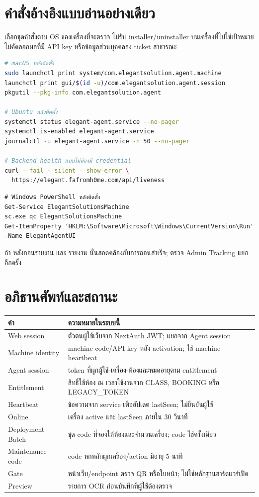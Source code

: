 \chapter{คำสั่งอ้างอิงแบบอ่านอย่างเดียว}
เลือกชุดคำสั่งตาม OS ของเครื่องที่จะตรวจ ไม่รัน installer/uninstaller บนเครื่องที่ไม่ใช่เป้าหมาย ไม่คัดลอกผลที่มี API key หรือข้อมูลส่วนบุคคลลง ticket สาธารณะ
\begin{lstlisting}[language=bash]
# macOS หลังติดตั้ง
sudo launchctl print system/com.elegantsolution.agent.machine
launchctl print gui/$(id -u)/com.elegantsolution.agent.session
pkgutil --pkg-info com.elegantsolution.agent

# Ubuntu หลังติดตั้ง
systemctl status elegant-agent.service --no-pager
systemctl is-enabled elegant-agent.service
journalctl -u elegant-agent.service -n 50 --no-pager

# Backend health แบบไม่ต้องมี credential
curl --fail --silent --show-error \
  https://elegant.fafromh0me.com/api/liveness
\end{lstlisting}
\begin{lstlisting}
# Windows PowerShell หลังติดตั้ง
Get-Service ElegantSolutionsMachine
sc.exe qc ElegantSolutionsMachine
Get-ItemProperty 'HKLM:\Software\Microsoft\Windows\CurrentVersion\Run' -Name ElegantAgentUI
\end{lstlisting}
ถ้า  หลังถอนรายงาน  และ  รายงาน  นั่นสอดคล้องกับการถอนสำเร็จ; ตรวจ Admin Tracking แยกอีกครั้ง

\chapter{อภิธานศัพท์และสถานะ}
\begin{longtable}{L{41mm}L{106mm}}
\toprule คำ & ความหมายในระบบนี้ \\ \midrule\endhead
Web session & ตัวตนผู้ใช้เว็บจาก NextAuth JWT; แยกจาก Agent session \\
Machine identity & machine code/API key หลัง activation; ใช้ machine heartbeat \\
Agent session & token ที่ผูกผู้ใช้-เครื่อง-ห้องและหมดอายุตาม entitlement \\
Entitlement & สิทธิ์ใช้ห้อง ณ เวลาใช้งานจาก CLASS, BOOKING หรือ LEGACY\_TOKEN \\
Heartbeat & ข้อความจาก service เพื่ออัปเดต lastSeen; ไม่ยืนยันผู้ใช้ \\
Online & เครื่อง active และ lastSeen ภายใน 30 วินาที \\
Deployment Batch & ชุด code ที่จองให้ห้องและจำนวนเครื่อง; code ใช้ครั้งเดียว \\
Maintenance code & code หกหลักผูกเครื่อง/action มีอายุ 5 นาที \\
Gate & หน้าเว็บ/endpoint ตรวจ QR หรือใบหน้า; ไม่ใช่หลักฐานฮาร์ดแวร์เปิด \\
Preview & รายการ OCR ก่อนบันทึกที่ผู้ใช้ต้องตรวจ \\
\bottomrule
\end{longtable}


